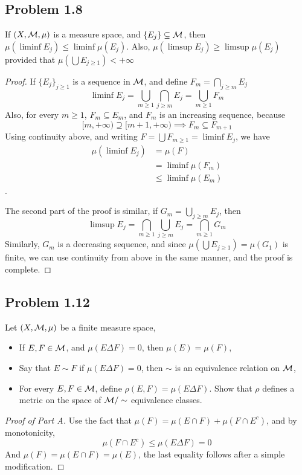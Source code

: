 \documentclass[../../main.tex]{subfiles}
\begin{document}
\newpage\subsection*{Problem 1.8}
\begin{wts}
    If $(X,\mathcal{M},\mu)$ is a measure space, and $\{E_j\}\subseteq \mathcal{M}$, then $\mu(\liminf E_j)\leq \liminf \mu(E_j)$. Also, $\mu(\limsup E_j)\geq \limsup \mu(E_j)$ provided that $\mu(\bigcup E_{j\geq 1})<+\infty$
\end{wts}
\begin{proof}
If $\{E_j\}_{j\geq 1}$ is a sequence in $\mathcal{M}$, and define $F_m = \bigcap_{j\geq m}E_j$
\[
\liminf E_j = \bigcup_{m\geq 1}\bigcap_{j\geq m}E_j = \bigcup_{m\geq 1} F_m
\]
Also, for every $m\geq 1$, $F_m\subseteq E_m$, and $F_m$ is an increasing sequence, because
\[
[m,+\infty)\supseteq [m+1,+\infty)\implies F_m\subseteq F_{m+1}
\]
Using continuity above, and writing $F = \bigcup F_{m\geq 1}=\liminf E_j$, we have
\begin{align*}
    \mu(\liminf E_j) &= \mu(F)\\
    &= \liminf \mu(F_m)\\
    &\leq \liminf \mu(E_m)
\end{align*}.

The second part of the proof is similar, if $G_m = \bigcup_{j\geq m} E_j$, then
\[
\limsup E_j = \bigcap_{m\geq 1}\bigcup_{j\geq m} E_j = \bigcap_{m\geq 1}G_m
\]
Similarly, $G_m$ is a decreasing sequence, and since $\mu(\bigcup E_{j\geq 1}) = \mu(G_1)$ is finite, we can use continuity from above in the same manner, and the proof is complete.
\end{proof}
\newpage\subsection*{Problem 1.12}
\begin{wts}
Let $(X,\mathcal{M},\mu)$ be a finite measure space,
\begin{itemize}
    \item If $E,F\in\mathcal{M}$, and $\mu(E\Delta F)=0$, then $\mu(E)=\mu(F)$,
    \item Say that $E\sim F$ if $\mu(E\Delta F)=0$, then $\sim$ is an equivalence relation on $\mathcal{M}$,
    \item For every $E,F\in\mathcal{M}$, define $\rho(E,F)=\mu(E\Delta F)$. Show that $\rho$ defines a metric on the space of $\mathcal{M}/\sim$ equivalence classes.
\end{itemize}
\end{wts}
\begin{proof}[Proof of Part A]
    Use the fact that $\mu(F)=\mu(E\cap F)+\mu(F\cap E^c)$, and by monotonicity,
    \[
    \mu(F\cap E^c)\leq \mu(E\Delta F)=0
    \]
    And $\mu(F)=\mu(E\cap F)=\mu(E)$, the last equality follows after a simple modification.
\end{proof}
\end{document}
